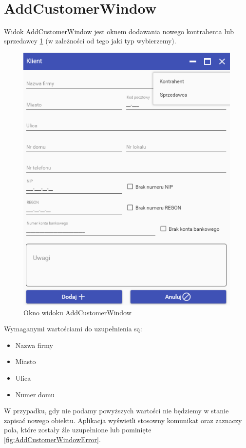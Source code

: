 \newpage~\newpage~\newpage~
\section{AddCustomerWindow}
Widok AddCustomerWindow jest oknem dodawania nowego kontrahenta lub sprzedawcy \ref{fig:AddCustomerWindow} (w zależności od tego jaki typ wybierzemy). 

\begin{figure}[ht!]
\centering
  \includegraphics[width=0.7\linewidth]{Rysunki/AddCustomer/CustomerWindow.png}
  \caption{Okno widoku AddCustomerWindow}
  \label{fig:AddCustomerWindow}
\end{figure}

Wymaganymi wartościami do uzupełnienia są:

\begin{itemize}
    \item Nazwa firmy
    \item Miasto
    \item Ulica
    \item Numer domu
\end{itemize}

W przypadku, gdy nie podamy powyższych wartości nie będziemy w stanie zapisać nowego obiektu. Aplikacja wyświetli stosowny komunikat oraz zaznaczy pola, które zostały źle uzupełnione lub pominięte \ref{fig:AddCustomerWindowError}. 


